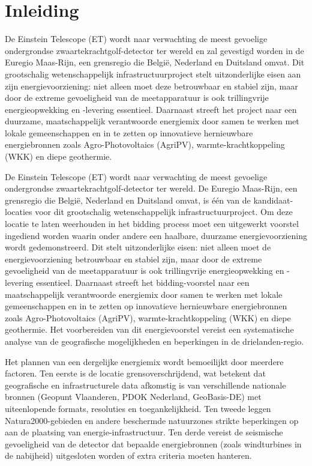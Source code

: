 \section{Inleiding}%
\label{sec:inleiding}

De Einstein Telescope (ET) wordt naar verwachting de meest gevoelige ondergrondse zwaartekrachtgolf-\-detector ter wereld en zal gevestigd worden in de Euregio Maas-\-Rijn, een grensregio die België, Nederland en Duitsland omvat. Dit grootschalig wetenschappelijk infrastructuurproject stelt uitzonderlijke eisen aan zijn energievoorziening: niet alleen moet deze betrouwbaar en stabiel zijn, maar door de extreme gevoeligheid van de meetapparatuur is ook trillingvrije energieopwekking en -\-levering essentieel. Daarnaast streeft het project naar een duurzame, maatschappelijk verantwoorde energiemix door samen te werken met lokale gemeenschappen en in te zetten op innovatieve hernieuwbare energiebronnen zoals Agro-\-Photovoltaics (AgriPV), warmte-\-krachtkoppeling (WKK) en diepe geothermie.

De Einstein Telescope (ET) wordt naar verwachting de meest gevoelige ondergrondse zwaartekrachtgolf-\-detector ter wereld. De Euregio Maas-\-Rijn, een grensregio die België, Nederland en Duitsland omvat, is één van de kandidaat-\-locaties voor dit grootschalig wetenschappelijk infrastructuurproject. Om deze locatie te laten weerhouden in het bidding process moet een uitgewerkt voorstel ingediend worden waarin onder andere een haalbare, duurzame energievoorziening wordt gedemonstreerd. Dit stelt uitzonderlijke eisen: niet alleen moet de energievoorziening betrouwbaar en stabiel zijn, maar door de extreme gevoeligheid van de meetapparatuur is ook trillingvrije energieopwekking en -\-levering essentieel. Daarnaast streeft het bidding-\-voorstel naar een maatschappelijk verantwoorde energiemix door samen te werken met lokale gemeenschappen en in te zetten op innovatieve hernieuwbare energiebronnen zoals Agro-\-Photovoltaics (AgriPV), warmte-\-krachtkoppeling (WKK) en diepe geothermie. Het voorbereiden van dit energievoorstel vereist een systematische analyse van de geografische mogelijkheden en beperkingen in de drielanden-\-regio.

Het plannen van een dergelijke energiemix wordt bemoeilijkt door meerdere factoren. Ten eerste is de locatie grensoverschrijdend, wat betekent dat geografische en infrastructurele data afkomstig is van verschillende nationale bronnen (Geopunt Vlaanderen, PDOK Nederland, GeoBasis-DE) met uiteenlopende formats, resoluties en toegankelijkheid. Ten tweede leggen Natura2000-\-gebieden en andere beschermde natuurzones strikte beperkingen op aan de plaatsing van energie-\-infrastructuur. Ten derde vereist de seismische gevoeligheid van de detector dat bepaalde energiebronnen (zoals windturbines in de nabijheid) uitgesloten worden of extra criteria moeten hanteren.

